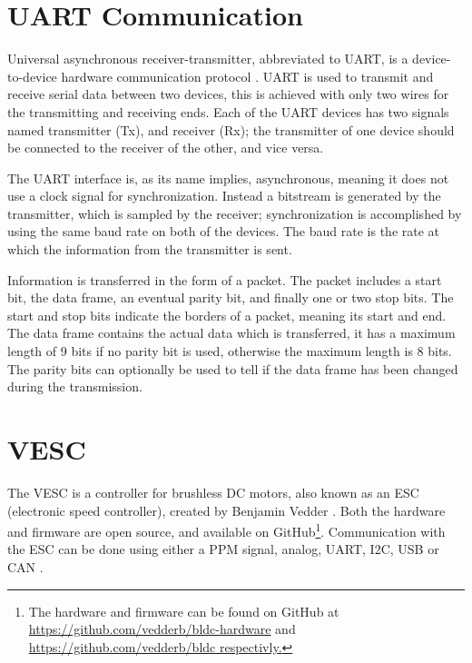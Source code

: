 \section{UART Communication}
Universal asynchronous receiver-transmitter, abbreviated to UART, is a device-to-device hardware communication protocol \cite{GraceLegaspi2020UART:Receiver/Transmitter}. UART is used to transmit and receive serial data between two devices, this is achieved with only two wires for the transmitting and receiving ends. Each of the UART devices has two signals named transmitter (Tx), and receiver (Rx); the transmitter of one device should be connected to the receiver of the other, and vice versa.

The UART interface is, as its name implies, asynchronous, meaning it does not use a clock signal for synchronization. Instead a bitstream is generated by the transmitter, which is sampled by the receiver; synchronization is accomplished by using the same baud rate on both of the devices.
The baud rate is the rate at which the information from the transmitter is sent.

Information is transferred in the form of a packet. The packet includes a start bit, the data frame, an eventual parity bit, and finally one or two stop bits. The start and stop bits indicate the borders of a packet, meaning its start and end. The data frame contains the actual data which is transferred, it has a maximum length of 9 bits if no parity bit is used, otherwise the maximum length is 8 bits. The parity bits can optionally be used to tell if the data frame has been changed during the transmission.

\section{VESC} \label{theory:vesc}
The VESC is a controller for brushless DC motors, also known as an ESC (electronic speed controller), created by Benjamin Vedder \cite{Vedder2014AESC}. Both the hardware and firmware are open source, and available on GitHub\footnote{The hardware and firmware can be found on GitHub at \url{https://github.com/vedderb/bldc-hardware} and \url{https://github.com/vedderb/bldc respectivly.}}. Communication with the ESC can be done using either a PPM signal, analog, UART, I2C, USB or CAN \cite{Vedder2016VESCESC}.

